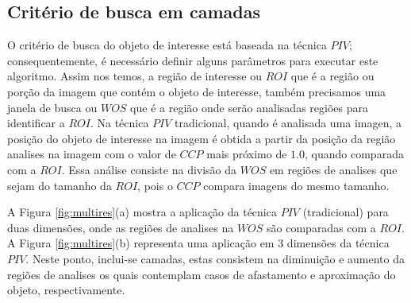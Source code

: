 \subsection{Critério de busca em camadas}

O critério de busca do objeto de interesse está baseada na técnica $PIV$; 
consequentemente, é necessário definir alguns parâmetros para executar  
este algoritmo. Assim nos temos, a região de interesse ou $ROI$ 
 que é a região ou porção da imagem que contém
o objeto de interesse, também precisamos uma janela de busca ou $WOS$
que é a região onde serão analisadas regiões para identificar a $ROI$. 
Na técnica $PIV$ tradicional, quando é analisada uma imagen, 
a posição do objeto de interesse na imagem é obtida a partir 
da posição da região analises na imagem com o valor de $CCP$ mais próximo de $1.0$,
quando comparada com a $ROI$. 
Essa análise consiste na divisão da $WOS$ em regiões de analises que sejam do tamanho da $ROI$, pois o $CCP$
compara imagens do mesmo tamanho.

A Figura \ref{fig:multires}(a) mostra a aplicação da técnica $PIV$ (tradicional)
para duas dimensões, onde as regiões de analises na $WOS$
são comparadas com a $ROI$. 
A Figura \ref{fig:multires}(b) representa uma aplicação em 3 dimensões da técnica $PIV$. 
Neste ponto, inclui-se camadas, estas consistem na diminuição e aumento da regiões de analises os quais 
contemplam casos de afastamento e aproximação do objeto, respectivamente.

